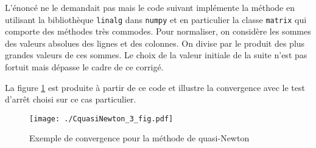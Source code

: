 L'énoncé ne le demandait pas mais le code suivant implémente la méthode en utilisant la bibliothèque \texttt{linalg} dans \texttt{numpy} et en particulier la classe \texttt{matrix} qui comporte des méthodes très commodes.\newline
Pour normaliser, on considère les sommes des valeurs absolues des lignes et des colonnes. On divise par le produit des plus grandes valeurs de ces sommes. Le choix de la valeur initiale de la suite n'est pas fortuit mais dépasse le cadre de ce corrigé.

La figure \ref{fig:CquasiNewton_3} est produite à partir de ce code et illustre la convergence avec le test d'arrêt choisi sur ce cas particulier.
\begin{figure}[h]
  \centering
  \texttt{[image: ./CquasiNewton\_3\_fig.pdf]}
  \caption{Exemple de convergence pour la méthode de quasi-Newton}
  \label{fig:CquasiNewton_3}
\end{figure}

